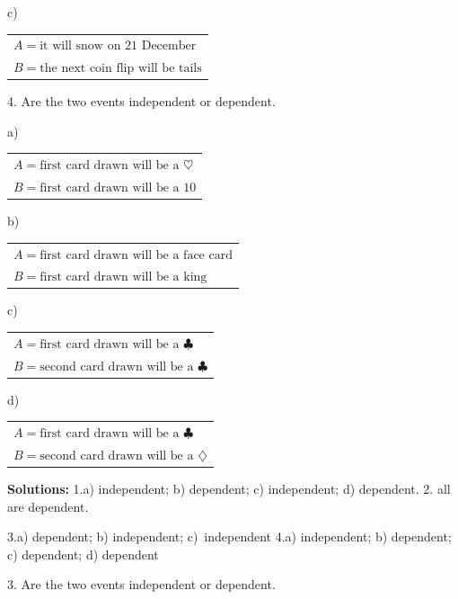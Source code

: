 \documentclass[10pt]{article}
\begin{document}
\hspace{20pt} c)
\begin{tabular}{l}
$A=\mbox{it will snow on 21 December}$\\[2pt]
$B=\mbox{the next coin flip will be tails}$\\
\end{tabular}
\medskip

4. Are the two events independent or dependent.

\hspace{20pt} a)
\begin{tabular}{l}
$A=\mbox{first card drawn will be a $\heartsuit$}$\\[2pt]
$B=\mbox{first card drawn will be a 10}$\\
\end{tabular}
\medskip

\hspace{20pt} b)
\begin{tabular}{l}
$A=\mbox{first card drawn will be a face card}$\\[2pt]
$B=\mbox{first card drawn will be a king}$\\
\end{tabular}
\medskip

\hspace{20pt} c)
\begin{tabular}{l}
$A=\mbox{first card drawn will be a $\clubsuit$}$\\[2pt]
$B=\mbox{second card drawn will be a $\clubsuit$}$\\
\end{tabular}
\medskip

\hspace{20pt} d)
\begin{tabular}{l}
$A=\mbox{first card drawn will be a $\clubsuit$}$\\[2pt]
$B=\mbox{second card drawn will be a $\diamondsuit$}$\\
\end{tabular}
\medskip

{\scriptsize \textbf{Solutions:} 1.a) independent; b) dependent; c) independent; d) dependent.\hspace{10pt}
2. all are dependent.\vspace{-5pt}

3.a) dependent; b) independent; c)~independent\hspace{10pt}
4.a) independent; b) dependent; c) dependent; d) dependent}
\vfill

3. Are the two events independent or dependent.
\end{document}
